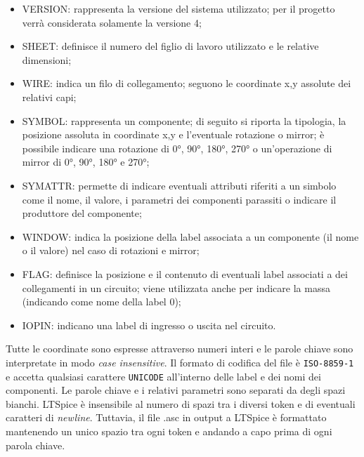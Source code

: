 \begin{itemize}
	\item VERSION: rappresenta la versione del sistema utilizzato; per il progetto verrà considerata solamente la versione 4;
	\item SHEET: definisce il numero del figlio di lavoro utilizzato e le relative dimensioni;
	\item WIRE: indica un filo di collegamento; seguono le coordinate x,y assolute dei relativi capi;
	\item SYMBOL: rappresenta un componente; di seguito si riporta la tipologia, la posizione assoluta in coordinate x,y e l'eventuale rotazione o mirror; è possibile indicare una rotazione di 0°, 90°, 180°, 270° o un'operazione di mirror di 0°, 90°, 180° e 270°;
	\item SYMATTR: permette di indicare eventuali attributi riferiti a un simbolo come il nome, il valore, i parametri dei componenti parassiti o indicare il produttore del componente;
	\item WINDOW: indica la posizione della label associata a un componente (il nome o il valore) nel caso di rotazioni e mirror;
	\item FLAG: definisce la posizione e il contenuto di eventuali label associati a dei collegamenti in un circuito; viene utilizzata anche per indicare la massa (indicando come nome della label 0);
	\item IOPIN: indicano una label di ingresso o uscita nel circuito. 
\end{itemize}
Tutte le coordinate sono espresse attraverso numeri interi e le parole chiave sono interpretate in modo \textit{case insensitive}. Il formato di codifica del file è \texttt{ISO-8859-1} e accetta qualsiasi carattere \texttt{UNICODE} all'interno delle label e dei nomi dei componenti. Le parole chiave e i relativi parametri sono separati da degli spazi bianchi. LTSpice è insensibile al numero di spazi tra i diversi token e di eventuali caratteri di \textit{newline}. Tuttavia, il file .asc in output a LTSpice è formattato mantenendo un unico spazio tra ogni token e andando a capo prima di ogni parola chiave.

